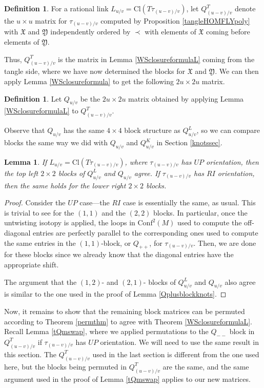 \documentclass[11pt]{amsart}
\theoremstyle{plain}
\newtheorem{lemmaN}[theoremN]{Lemma}
\theoremstyle{definition}
\newtheorem{definitionN}[theoremN]{Definition}
\theoremstyle{remark}
\begin{document}
\begin{definitionN}
    For a rational link $L_{u/v}=\text{Cl}(T\tau_{(u-v)/v})$, let $Q_{(u-v)/v}^T$ denote the $u\times u$ matrix for $\tau_{(u-v)/v}$ computed by Proposition \ref{tangleHOMFLYpoly} with $\mathfrak{X}$ and $\mathfrak{Y}$ independently ordered by $\prec$ with elements of $\mathfrak{X}$ coming before elements of $\mathfrak{Y}$.
\end{definitionN}

Thus, $Q_{(u-v)/v}^T$ is the matrix in Lemma \ref{WSclosureformulaL} coming from the tangle side, where we have now determined the blocks for $\mathfrak{X}$ and $\mathfrak{Y}$. We can then apply Lemma \ref{WSclosureformula} to get the following $2u\times 2u$ matrix.

\begin{definitionN}
    Let $Q_{u/v}$ be the $2u \times 2u$ matrix obtained by applying Lemma \ref{WSclosureformulaL} to $Q_{(u-v)/v}^T$.
\end{definitionN}

Observe that $Q_{u/v}$ has the same $4\times 4$ block structure as $Q_{u/v}^L$, so we can compare blocks the same way we did with $Q_{u/v}$ and $Q_{u/v}^K$ in Section \ref{knotssec}.

\begin{lemmaN}
  If $L_{u/v}=\text{Cl}(T\tau_{(u-v)/v})$, where $\tau_{(u-v)/v}$ has $UP$ orientation, then the top left $2\times 2$ blocks of $Q_{u/v}^L$ and $Q_{u/v}$ agree. If $\tau_{(u-v)/v}$ has $RI$ orientation, then the same holds for the lower right $2\times 2$ blocks.  
\end{lemmaN}

\begin{proof}
    Consider the $UP$ case---the $RI$ case is essentially the same, as usual. This is trivial to see for the $(1,1)$ and the $(2,2)$ blocks. In particular, once the untwisting isotopy is applied, the loops in $\text{Conf}^2(M)$ used to compute the off-diagonal entries are perfectly parallel to the corresponding ones used to compute the same entries in the $(1,1)$-block, or $Q_{++}$, for $\tau_{(u-v)/v}$. Then, we are done for these blocks since we already know that the diagonal entries have the appropriate shift.

    The argument that the $(1,2)$- and $(2,1)$- blocks of $Q_{u/v}^L$ and $Q_{u/v}$ also agree is similar to the one used in the proof of Lemma \ref{Qplusblockknots}. 
\end{proof}

Now, it remains to show that the remaining block matrices can be permuted according to Theorem \ref{permthm} to agree with Theorem \ref{WSclosureformulaL}. Recall Lemma \ref{tQmswap}, where we applied permutations to the $Q_{--}$ block in $Q_{(u-v)/v}^T$ if $\tau_{(u-v)/v}$ has $UP$ orientation. We will need to use the same result in this section. The $Q_{(u-v)/v}^T$ used in the last section is different from the one used here, but the blocks being permuted in $Q_{(u-v)/v}^T$ are the same, and the same argument used in the proof of Lemma \ref{tQmswap} applies to our new matrices.
\end{document}
